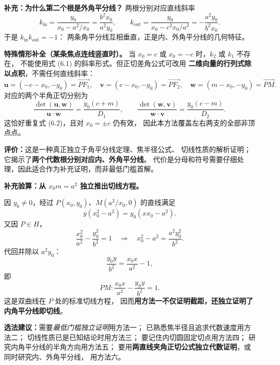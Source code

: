 \begin{proofbox}
\textbf{补充：为什么第二个根是外角平分线？}
两根分别对应直线斜率
\[
 k_{\mathrm{in}}=\frac{y_0}{x_0-a^2/x_0}
 =\frac{b^2x_0}{a^2y_0},\qquad
 k_{\mathrm{out}}=\frac{y_0}{x_0-c^2x_0/a^2}
 =-\frac{a^2y_0}{b^2x_0}.
\]
于是 $\boxed{k_{\mathrm{in}}k_{\mathrm{out}}=-1}$：
两条角平分线互相垂直，正是内、外角平分线的几何特征。

\medskip
\textbf{特殊情形补全（某条焦点连线竖直时）。}
当 $x_0=c$ 或 $x_0=-c$ 时，$k_2$ 或 $k_1$ 不存在，
不能使用式 (6.1) 的斜率形式。但正切差角公式可改用
\textbf{二维向量的行列式除以点积}，不需任何直线斜率：
\[
\boldsymbol u=(-c-x_0,-y_0)=\overrightarrow{PF_1},\quad
\boldsymbol v=(c-x_0,-y_0)=\overrightarrow{PF_2},\quad
\boldsymbol w=(m-x_0,-y_0)=\overrightarrow{PM}.
\]
对应的两个半角正切分别为
\[
\frac{\det(\boldsymbol u,\boldsymbol w)}
     {\boldsymbol u\cdot\boldsymbol w}
=\frac{y_0(c+m)}{D_1},\qquad
\frac{\det(\boldsymbol w,\boldsymbol v)}
     {\boldsymbol w\cdot\boldsymbol v}
=\frac{y_0(c-m)}{D_2}.
\]
这恰好重复式 (6.2)，且对 $x_0=\pm c$ 仍有效，
因此本方法覆盖左右两支的全部非顶点点。

\textbf{评价：}这是一种真正独立于角平分线定理、焦半径公式、
切线性质的解析证明；它揭示了\textbf{两个代数根分别对应内、外角平分线}。
代价是分母和符号需要仔细处理，因此适合作为补充证明，而非最低门槛首解。
\end{proofbox}

\clearpage
\begin{proofbox}
\textbf{补充验算：从 $x_0m=a^2$ 独立推出切线方程。}

因 $y_0\ne0$，经过 $P(x_0,y_0)$、$M(a^2/x_0,0)$ 的直线满足
\[
y(x_0^2-a^2)=y_0(xx_0-a^2).
\]
又因 $P\in H$，
\[
\frac{x_0^2}{a^2}-\frac{y_0^2}{b^2}=1
\quad\Longrightarrow\quad
x_0^2-a^2=\frac{a^2y_0^2}{b^2}.
\]
代回并除以 $a^2y_0$：
\[
\frac{y_0y}{b^2}=\frac{x_0x}{a^2}-1,
\]
即
\[
\boxed{PM:\frac{x_0x}{a^2}-\frac{y_0y}{b^2}=1}.
\]
这是双曲线在 $P$ 处的标准切线方程，
因而\textbf{用方法一不仅证明截距，还独立证明了内角平分线即切线}。

\medskip
\textbf{选法建议：}需要\emph{最低门槛独立证明}用方法一；
已熟悉焦半径且追求代数速度用方法二；
切线性质已是已知结论时用方法三；
要记住内切圆固定切点用方法四；
研究内角平分线的半角方向用方法五；
要用\textbf{两直线夹角正切公式独立代数证明}，或同时研究内、外角平分线，
用方法六。
\end{proofbox}
